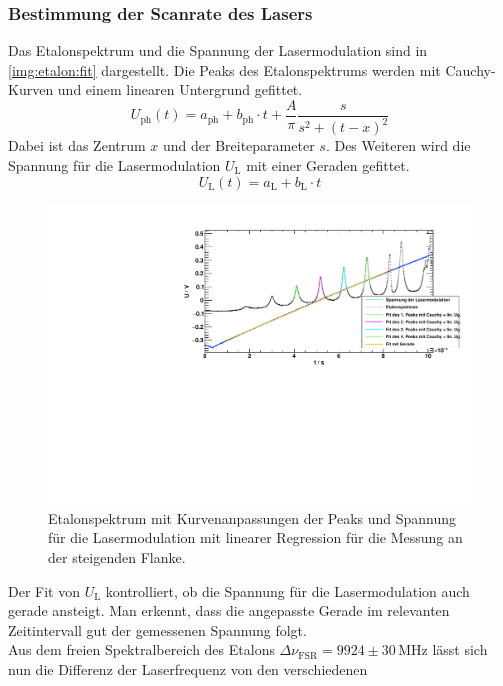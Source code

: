 \subsubsection*{Bestimmung der Scanrate des Lasers}
\label{sub:scanrate}
Das Etalonspektrum und die Spannung der Lasermodulation sind in \autoref{img:etalon:fit} dargestellt.
Die Peaks des Etalonspektrums werden mit Cauchy-Kurven und einem linearen Untergrund gefittet.
\begin{equation}
    U_\text{ph}(t) = a_\text{ph} + b_\text{ph} \cdot t + \frac{A}{\pi} \frac{s}{s^2 + (t-x)^2}
\end{equation}
Dabei ist das Zentrum $x$ und der Breiteparameter $s$.
Des Weiteren wird die Spannung für die Lasermodulation $U_\text{L}$ mit einer Geraden gefittet.
\begin{equation}
    U_\text{L}(t) = a_\text{L} + b_\text{L} \cdot t
\end{equation}
\begin{figure}[H]
\begin{center}
    \includegraphics[width=\textwidth]{../img/part2/up-etalon_zoom_fit.pdf}
    \caption{Etalonspektrum mit Kurvenanpassungen der Peaks und Spannung für die Lasermodulation mit linearer Regression für die Messung an der steigenden Flanke.}
    \label{img:etalon:fit}
\end{center}
\end{figure}
Der Fit von $U_\text{L}$ kontrolliert, ob die Spannung für die Lasermodulation auch gerade ansteigt. Man erkennt, dass die angepasste Gerade 
im relevanten Zeitintervall gut der gemessenen Spannung folgt.\\
Aus dem freien Spektralbereich des Etalons $\Delta \nu_\text{FSR} = 9924 \pm 30\,\text{MHz}$ lässt sich nun die Differenz der Laserfrequenz von den verschiedenen
